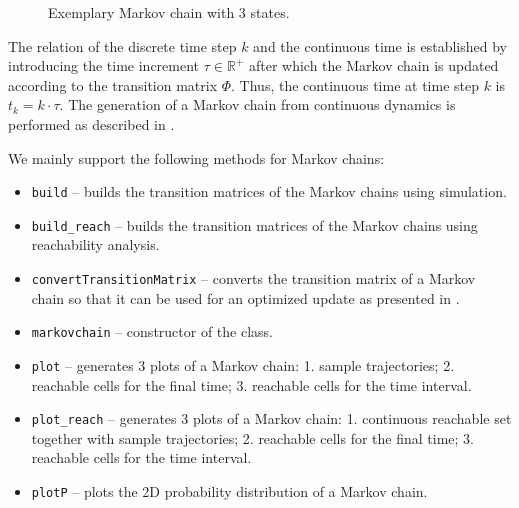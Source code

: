 \begin{center}
\begin{figure}[htb]
\centering 
	\caption{Exemplary Markov chain with 3 states.}
	\label{fig_markovChain}
\end{figure}
\end{center}


The relation of the discrete time step $k$ and the continuous time is established by introducing the time increment $\tau\in\mathbb{R}^+$ after which the Markov chain is updated according to the transition matrix $\Phi$. Thus, the continuous time at time step $k$ is $t_k=k\cdot\tau$. The generation of a Markov chain from continuous dynamics is performed as described in \cite[Sec.~4.3]{Althoff2010a}.



We mainly support the following methods for Markov chains:
\begin{itemize}
 \item \texttt{build} -- builds the transition matrices of the Markov chains using simulation.
 \item \texttt{build\_reach} -- builds the transition matrices of the Markov chains using reachability analysis.
 \item \texttt{convertTransitionMatrix} -- converts the transition matrix of a Markov chain so that it can be used for an optimized update as presented in \cite{Althoff2009a}.
 \item \texttt{markovchain} -- constructor of the class.
 \item \texttt{plot} -- generates 3 plots of a Markov chain: 1. sample trajectories; 2. reachable cells for the final time; 3. reachable cells for the time interval.
 \item \texttt{plot\_reach} -- generates 3 plots of a Markov chain: 1. continuous reachable set together with sample trajectories; 2. reachable cells for the final time; 3. reachable cells for the time interval.
 \item \texttt{plotP} -- plots the 2D probability distribution of a Markov chain.
\end{itemize}
